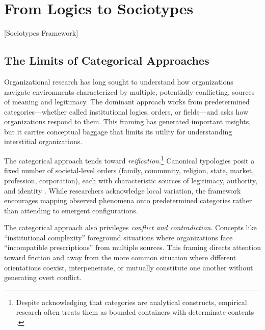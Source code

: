 \documentclass[../main.tex]{subfiles}
\begin{document}
\section{From Logics to Sociotypes}[Sociotypes Framework]

\subsection{The Limits of Categorical Approaches}

Organizational research has long sought to understand how organizations navigate environments characterized by multiple, potentially conflicting, sources of meaning and legitimacy. The dominant approach works from predetermined categories---whether called institutional logics, orders, or fields---and asks how organizations respond to them. This framing has generated important insights, but it carries conceptual baggage that limits its utility for understanding interstitial organizations.

The categorical approach tends toward \textit{reification}.\footnote{Despite acknowledging that categories are analytical constructs, empirical research often treats them as bounded containers with determinate contents \cite{ocasio2017theory}.} Canonical typologies posit a fixed number of societal-level orders (family, community, religion, state, market, profession, corporation), each with characteristic sources of legitimacy, authority, and identity \cite{thornton2012institutional}. While researchers acknowledge local variation, the framework encourages mapping observed phenomena onto predetermined categories rather than attending to emergent configurations.

The categorical approach also privileges \textit{conflict and contradiction}. Concepts like ``institutional complexity'' \cite{greenwood2011institutional} foreground situations where organizations face ``incompatible prescriptions'' from multiple sources. This framing directs attention toward friction and away from the more common situation where different orientations coexist, interpenetrate, or mutually constitute one another without generating overt conflict.
\end{document}
